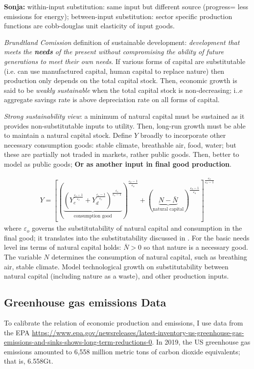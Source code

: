\textbf{Sonja:} within-input substitution: \ar same input but different source (progress= less emissions for energy); between-input substitution: 
\ar sector specific production functions are cobb-douglas \ar unit elasticity of input goods.


\textit{Brundtland Comission} definition of sustainable development: \textit{development that meets the \textbf{needs} of the present without compromising the ability of future generations to meet their own needs}.
If various forms of capital are substitutable (i.e. can use manufactured capital, human capital to replace nature) then production only depends on the total capital stock. Then, economic growth is said to be \textit{weakly sustainable} when the total capital stock is non-decreasing; i..e aggregate savings rate is above depreciation rate on all forms of capital. 

\textit{Strong sustainability view}:  a minimum of natural capital must be sustained as it provides non-substitutable inputs to utility. Then, long-run growth must be able to maintain a natural capital stock.  
\ar Define $Y$ broadly to incorporate other necessary consumption goods: stable climate, breathable air, food, water; but these are partially not traded in markets, rather public goods. Then, better to model as public goods; \textbf{Or as another input in final good production}.

\begin{align*}
Y= \left[\left(\underbrace{\left(Y_c^{\frac{\varepsilon_c-1}{\varepsilon_c}}+Y_d^{\frac{\varepsilon_c-1}{\varepsilon_c}}\right)^{\frac{\varepsilon_c}{\varepsilon_c-1}}}_{\text{consumption  good}}\right)^{\frac{\varepsilon_o-1}{\varepsilon_o}}+(\underbrace{N-\bar{N}}_{\text{natural capital}})^{\frac{\varepsilon_o-1}{\varepsilon_o}}\right]^{\frac{\varepsilon_o}{\varepsilon_o-1}}
\end{align*} 
where $\varepsilon_o$  governs the substitutability of natural capital and consumption in the final good; it translates into the substitutability discussed in \cite{Cohen2019AnnualSubstitutable}. For the basic needs level ins terms of natural capital holds: $\bar{N}>0$ so that nature is a necessary good. The variable $N$ determines the consumption of natural capital, such as breathing air, stable climate.
Model technological growth on substitutability between natural capital (including nature as a waste), and other production inputs.  

 
\subsection{Greenhouse gas emissions Data}
To calibrate the relation of economic production and emissions, I use data from the EPA \url{https://www.epa.gov/newsreleases/latest-inventory-us-greenhouse-gas-emissions-and-sinks-shows-long-term-reductions-0}.
In 2019, the US greenhouse gas emissions amounted to 6,558 million metric tons of carbon dioxide equivalents; that is, 6.558Gt. 

